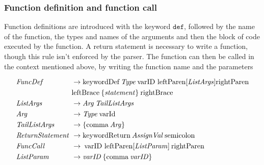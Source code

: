 \subsubsection*{Function definition and function call}

Function definitions are introduced with the keyword $\texttt{def}$, followed by the name of the function, the types and names of the arguments and then the block of code executed by the function.
A return statement is necessary to write a function, though this rule isn't enforced by the parser.
The function can then be called in the context mentioned above, by writing the function name and the parameters

\begin{align*}
    \omit $\mathit{FuncDef}$ \hfil &\rightarrow \text{keywordDef} \: \mathit{Type} \: \text{varID leftParen} [\mathit{ListArgs}] \text{rightParen} \\
    & \text{leftBrace} \: \{ \mathit{statement} \} \: \text{rightBrace} \\
    \omit $\mathit{ListArgs}$ \hfil &\rightarrow \mathit{Arg} \:  \mathit{TailListArgs} \\
    \omit $\mathit{Arg}$ \hfil &\rightarrow \mathit{Type} \: \text{varId} \\
    \omit $\mathit{TailListArgs}$ \hfil & \rightarrow \{ \text{comma} \: \mathit{Arg} \} \\
    \omit $\mathit{ReturnStatement}$ \hfil &\rightarrow \text{keywordReturn} \: \mathit{AssignVal} \: \text{semicolon} \\
    \omit $\mathit{FuncCall}$ \hfil &\rightarrow \: \text{varID leftParen} [\mathit{ListParam}] \: \text{rightParen} \\
    \omit $\mathit{ListParam}$ \hfil &\rightarrow \mathit{varID} \:  \{ \text{comma} \: \mathit{varID} \} \\
\end{align*}
